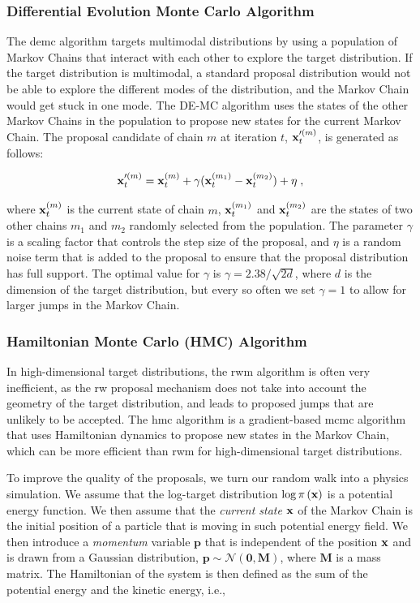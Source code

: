 \subsubsection{Differential Evolution Monte Carlo Algorithm}

The \gls{demc} algorithm targets multimodal distributions by using a population of Markov Chains that interact with each other to explore the target distribution. If the target distribution is multimodal, a standard proposal distribution would not be able to explore the different modes of the distribution, and the Markov Chain would get stuck in one mode. The DE-MC algorithm uses the states of the other Markov Chains in the population to propose new states for the current Markov Chain. The proposal candidate of chain $m$ at iteration $t$, $\mathbf{x}'^{(m)}_t$, is generated as follows:

\begin{equation}
  \mathbf{x}'^{(m)}_t = \mathbf{x}^{(m)}_t + \gamma (\mathbf{x}^{(m_1)}_t - \mathbf{x}^{(m_2)}_t) + \eta\;,
\end{equation}

where $\mathbf{x}^{(m)}_t$ is the current state of chain $m$, $\mathbf{x}^{(m_1)}_t$ and $\mathbf{x}^{(m_2)}_t$ are the states of two other chains $m_1$ and $m_2$ randomly selected from the population. The parameter $\gamma$ is a scaling factor that controls the step size of the proposal, and $\eta$ is a random noise term that is added to the proposal to ensure that the proposal distribution has full support. The optimal value for $\gamma$ is $\gamma = 2.38 / \sqrt{2d}$, where $d$ is the dimension of the target distribution, but every so often we set $\gamma = 1$ to allow for larger jumps in the Markov Chain. 

\subsubsection{Hamiltonian Monte Carlo (HMC) Algorithm}
In high-dimensional target distributions, the \gls{rwm} algorithm is often very inefficient, as the \gls{rw} proposal mechanism does not take into account the geometry of the target distribution, and leads to proposed jumps that are unlikely to be accepted. The \gls{hmc} algorithm is a gradient-based \gls{mcmc} algorithm that uses Hamiltonian dynamics to propose new states in the Markov Chain, which can be more efficient than \gls{rwm} for high-dimensional target distributions. 

\smallskip
To improve the quality of the proposals, we turn our random walk into a physics simulation. We assume that the log-target distribution $\log \pi \left( \mathbf{x}\right)$ is a potential energy function. We then assume that the \textit{current state} $\mathbf{x}$ of the Markov Chain is the initial position of a particle that is moving in such potential energy field. We then introduce a \textit{momentum} variable $\mathbf{p}$ that is independent of the position $\mathbf{x}$ and is drawn from a Gaussian distribution, $\mathbf{p} \sim \mathcal{N}(\mathbf{0}, \mathbf{M})$, where $\mathbf{M}$ is a mass matrix. The Hamiltonian of the system is then defined as the sum of the potential energy and the kinetic energy, i.e.,

